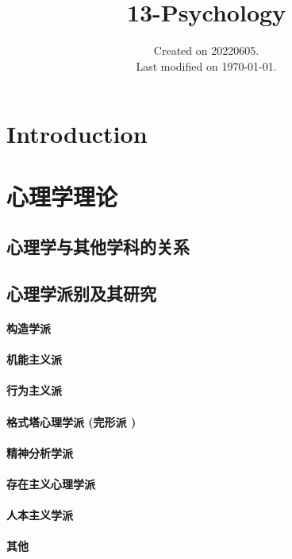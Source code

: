 \documentclass[UTF8]{../RepresentationUniverse}
\begin{document}
\title{13-Psychology}
\date{Created on 20220605.\\   Last modified on \today.}
\maketitle
\tableofcontents


\chapter{Introduction}


\chapter{心理学理论}
\section{心理学与其他学科的关系}
\section{心理学派别及其研究}
    \subsubsection{构造学派}
    \subsubsection{机能主义派}
    \subsubsection{行为主义派}
    \subsubsection{格式塔心理学派 (完形派 )}
    \subsubsection{精神分析学派}
    \subsubsection{存在主义心理学派}
    \subsubsection{人本主义学派}
    \subsubsection{其他}
\end{document}
